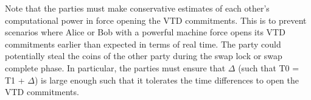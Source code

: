 \documentclass{article}      	%
\begin{document}
Note that the parties must make conservative estimates of each other’s computational
power in force opening the VTD commitments. This is to
prevent scenarios where Alice or Bob with a powerful machine
force opens its VTD commitments earlier than expected in
terms of real time. The party could potentially steal the coins
of the other party during the swap lock or swap complete
phase. In particular, the parties must ensure that $\Delta$ (such that
T0 = T1 + $\Delta$) is large enough such that it tolerates the time
differences to open the VTD commitments.
\end{document}
